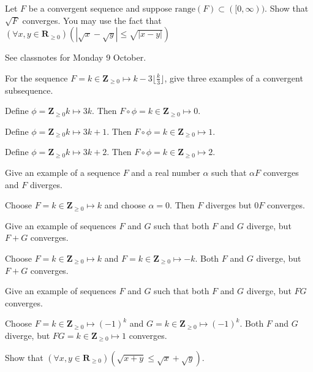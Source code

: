 \documentclass[12pt, fleqn, answers]{exam}
\newcommand{\reals}{\mathbf{R}}
\newcommand{\integers}{\mathbf{Z}}
\newcommand{\range}{\mathrm{range}}
\begin{document}
\begin{questions}
\begin{solution}
\end{solution}

\question Let $F$ be a convergent sequence and suppose $\range(F) \subset([0,\infty))$. Show that $\sqrt{F}$ converges.
You may use the fact that $\left(\forall x,y \in \reals_{\geq 0}\right)  (| \sqrt{x} - \sqrt{y} | \leq \sqrt{|x - y|} )$

\begin{solution}
See classnotes for Monday 9 October.
\end{solution}

\question For the sequence $F  = k \in \integers_{\geq 0} \mapsto k - 3 \lfloor \frac{k}{3} \rfloor $, give three examples of
a convergent subsequence.

\begin{solution}  Define $\phi = \integers_{\geq 0} k \mapsto  3 k$.
  Then $F \circ \phi = k \in \integers_{\geq 0} \mapsto 0$.

  Define $\phi = \integers_{\geq 0} k \mapsto  3 k + 1$.
  Then $F \circ \phi = k \in \integers_{\geq 0} \mapsto 1$.

  Define $\phi = \integers_{\geq 0} k \mapsto  3 k + 2$.
  Then $F \circ \phi = k \in \integers_{\geq 0} \mapsto 2$.

  
\end{solution}

\question Give an example of a sequence $F$ and a real number $\alpha$ such that $\alpha F$ converges and $F$ diverges.
\begin{solution} Choose $F = k \in \integers_{\geq 0} \mapsto k$ and choose $\alpha = 0$. Then $F$ diverges but $0F$ 
converges.
\end{solution}
 \question Give an example of sequences $F$ and $G$ such that both $F$ and $G$ diverge, but $F+ G$ converges.
 \begin{solution} Choose $F = k \in \integers_{\geq 0} \mapsto k$ and $F = k \in \integers_{\geq 0} \mapsto -k$.
 Both $F$ and $G$ diverge, but $F+G$ converges.
 \end{solution}
 
  \question Give an example of sequences $F$ and $G$ such that both $F$ and $G$ diverge, but $F G$ converges.
 \begin{solution} Choose $F = k \in \integers_{\geq 0} \mapsto (-1)^k$ and $G = k \in \integers_{\geq 0} \mapsto (-1)^k$.
 Both $F$ and $G$ diverge, but $F G =  k \in \integers_{\geq 0} \mapsto 1$ converges.
 \end{solution}
\question Show that $\left(\forall x,y \in \reals_{\geq 0}\right)(\sqrt{x+y} \leq \sqrt{x} +\sqrt{y})$.


\end{questions}
\end{document}
